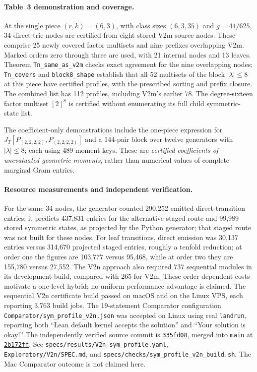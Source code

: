 \documentclass[11pt]{article}
\newcommand{\code}[1]{\texttt{#1}}
\begin{document}
\paragraph{Table~3 demonstration and coverage.}
At the single piece $(r,k)=(6,3)$, with class sizes $(6,3,35)$ and
$g=41/625$, 34 direct trie nodes are certified from eight stored V2m
source nodes. These comprise 25 newly covered factor multisets and nine
prefixes overlapping V2m. Marked orders zero through three are used,
with 21 internal nodes and 13 leaves. Theorem \code{Tn\_same\_as\_v2m}
checks exact agreement for the nine overlapping nodes;
\code{Tn\_covers} and \code{block8\_shape} establish that all 52
multisets of the block $|\lambda|\le8$ at this piece have certified
profiles, with the prescribed sorting and prefix closure. The combined
list has 112 profiles, including V2m's earlier 78. The degree-sixteen
factor multiset $[2]^8$ is certified without enumerating its full child
symmetric-state list.

The coefficient-only demonstrations include the one-piece expression for
$J_T[P_{(2,2,2,2)},P_{(2,2,2,2)}]$ and a 144-pair block over twelve
generators with $|\lambda|\le8$; each using 489 moment keys. These
are \emph{certified coefficients of unevaluated geometric moments}, rather
than numerical values of complete marginal Gram entries.

\paragraph{Resource measurements and independent verification.}
For the same 34 nodes, the generator counted 290,252 emitted
direct-transition entries; it predicts 437,831 entries for the alternative
staged route and 99,989 stored symmetric states, as projected by the
Python generator; that staged route was not built for these nodes. For leaf
transitions, direct
emission was 30,137 entries versus 314,670 projected staged entries,
roughly a tenfold reduction; at order one the figures are 103,777 versus
95,468, while at order two they are 155,780 versus 27,552.
The V2n approach also required 737 sequential modules in its development
build, compared with 265 for V2m. These order-dependent costs motivate
a one-level hybrid; no uniform performance advantage is claimed.
The sequential V2n certificate build passed on macOS and on
the Linux VPS, each reporting 3,763 build jobs. The 19-statement Comparator
configuration \nolinkurl{Comparator/sym_profile_v2n.json} was accepted
on Linux using real \code{landrun}, reporting both ``Lean default kernel
accepts the solution'' and ``Your solution is okay!'' The independently
verified source commit is
\href{https://github.com/thinkthoughts/lean-bgp212/commit/335fd08}{\code{335fd08}},
merged into \code{main} at
\href{https://github.com/thinkthoughts/lean-bgp212/commit/2b172ff}{\code{2b172ff}}.
See \nolinkurl{specs/results/V2n_sym_profile.yaml},
\nolinkurl{Exploratory/V2n/SPEC.md}, and
\nolinkurl{specs/checks/sym_profile_v2n_build.sh}.
The Mac Comparator outcome is not claimed here.
\end{document}
